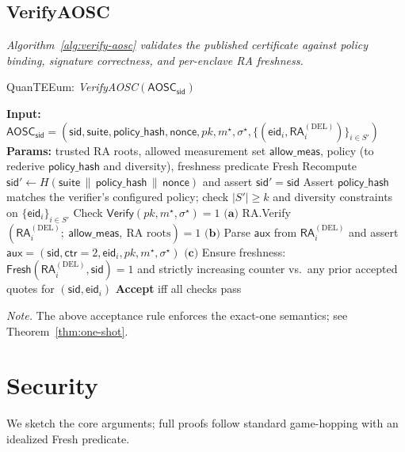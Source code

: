 \documentclass[runningheads,orivec]{llncs}
\newcommand{\prot}{\textsf{QuanTEEum}}
\newcommand{\sid}{\mathsf{sid}}
\begin{document}
\subsection{VerifyAOSC}
\emph{Algorithm~\ref{alg:verify-aosc} validates the published certificate against policy binding, signature correctness, and per-enclave RA freshness.}


\begin{algorithm}[!htbp]
\caption{\prot{}: \emph{VerifyAOSC}$(\mathsf{AOSC}_\sid)$}
\label{alg:verify-aosc}
\begin{small}
\begin{algorithmic}[1]
\State \textbf{Input:} $\mathsf{AOSC}_\sid = (\sid,\mathsf{suite},\mathsf{policy\_hash},\mathsf{nonce},pk,m^{\star},\sigma^{\star},\{(\mathsf{eid}_i,\mathsf{RA}^{(\mathrm{DEL})}_i)\}_{i\in S'})$
\State \textbf{Params:} trusted RA roots, allowed measurement set $\textsf{allow\_meas}$, policy (to rederive $\mathsf{policy\_hash}$ and diversity), freshness predicate \textsf{Fresh}
\State Recompute $\sid' \gets H(\mathsf{suite}\,\|\,\mathsf{policy\_hash}\,\|\,\mathsf{nonce})$ and assert $\sid'=\sid$
\State Assert $\mathsf{policy\_hash}$ matches the verifier’s configured policy; check $|S'|\ge k$ and diversity constraints on $\{\mathsf{eid}_i\}_{i\in S'}$
\State Check $\mathsf{Verify}(pk,m^{\star},\sigma^{\star})=1$
  \State $\textbf{(a)}$ \textsf{RA.Verify}$(\mathsf{RA}^{(\mathrm{DEL})}_i;\ \textsf{allow\_meas},\ \text{RA roots})=1$
  \State $\textbf{(b)}$ Parse $\mathsf{aux}$ from $\mathsf{RA}^{(\mathrm{DEL})}_i$ and assert $\mathsf{aux}=(\sid,\mathsf{ctr}{=}2,\mathsf{eid}_i,pk,m^{\star},\sigma^{\star})$
  \State $\textbf{(c)}$ Ensure freshness: $\textsf{Fresh}(\mathsf{RA}^{(\mathrm{DEL})}_i,\sid)=1$ and strictly increasing counter vs.\ any prior accepted quotes for $(\sid,\mathsf{eid}_i)$
\EndFor
\State \textbf{Accept} iff all checks pass
\end{algorithmic}
\end{small}
\end{algorithm}

\noindent\emph{Note.} The above acceptance rule enforces the exact-one semantics; see Theorem~\ref{thm:one-shot}.

\section{Security}\label{sec:security}
We sketch the core arguments; full proofs follow standard game-hopping with an idealized \textsf{Fresh} predicate.
\end{document}
